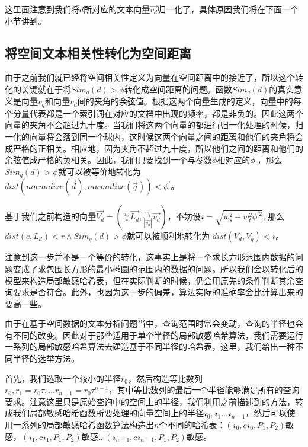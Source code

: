 这里面注意到我们将$ d $所对应的文本向量$ \vec{v_d} $归一化了，具体原因我们将在下面一个小节讲到。

\subsection{将空间文本相关性转化为空间距离}

由于之前我们就已经将空间相关性定义为向量在空间距离中的接近了，所以这个转化的关键就在于将$ Sim_q(d) > \phi $转化成空间距离的问题。函数$ Sim_q(d) $的真实意义是向量$ v_q $和向量$ v_d $间的夹角的余弦值。根据这两个向量生成的定义，向量中的每个分量代表都是一个索引词在对应的文档中出现的频率，都是非负的。因此这两个向量的夹角不会超过九十度。当我们将这两个向量的都进行归一化处理的时候，归一化的向量将会落到同一个球内，这时候这两个向量之间的距离和他们的夹角将会成严格的正相关。相应地，因为夹角不超过九十度，所以他们之间的距离和他们的余弦值成严格的负相关。因此，我们只要找到一个与参数$ \phi $相对应的$ \phi^{'} $，那么$ Sim_q(d) > \phi $就可以被等价地转化为$ dist(normalize(\vec{d}),normalize(\vec{q})) < \phi^{'} $。

基于我们之前构造的向量$ \vec{V_d} = (\frac{w_s}{r}\vec{L_d},\frac{w_t}{|\vec{v_d}|}\vec{v_d}) $，不妨设$ \mathcal{r} = \sqrt{w_s^2 + w_t^2\phi^{'2}} $, 那么$ dist(c,L_d) < r \land Sim_q(d) > \phi $就可以被顺利地转化为 $ dist(V_d,V_q) < \mathcal{r} $。

注意到这一步并不是一个等价的转化，这事实上是将一个求长方形范围内数据的问题变成了求包围长方形的最小椭圆的范围内的数据的问题。所以我们会以转化后的模型来构造局部敏感哈希表，但在实际判断的时候，仍会用原先的条件判断其余查询要求是否符合。此外，也因为这一步的偏差，算法实际的准确率会比计算出来的要高一些。

由于在基于空间数据的文本分析问题当中，查询范围时常会变动，查询的半径也会有不同的改变。因此对于那些适用于单个半径的局部敏感哈希算法，我们需要运行一系列的局部敏感哈希算法去建造基于不同半径的哈希表，这里，我们给出一种不同半径的选举方法。

首先，我们选取一个较小的半径$ r_0 $，然后构造等比数列$ r_0, r_1 = r_0\tau, \dots r_{n-1}=r_0\tau^{n - 1} $，其中等比数列的最后一个半径能够满足所有的查询要求。注意这里只是原始查询中的空间上的半径，我们利用之前描述到的方法，转成我们局部敏感哈希函数所要处理的向量空间上的半径$ \mathcal{r}_0, \mathcal{r}_1 \dots \mathcal{r}_{n-1} $，然后可以使用一系列的局部敏感哈希函数算法构造出$ n $个不同的哈希表：$ (\mathcal{r}_0,c\mathcal{r}_0,P_1,P_2) $敏感，$ (\mathcal{r}_1,c\mathcal{r}_1,P_1,P_2) $敏感...$ (\mathcal{r}_{n-1},c\mathcal{r}_{n-1},P_1,P_2) $敏感。

